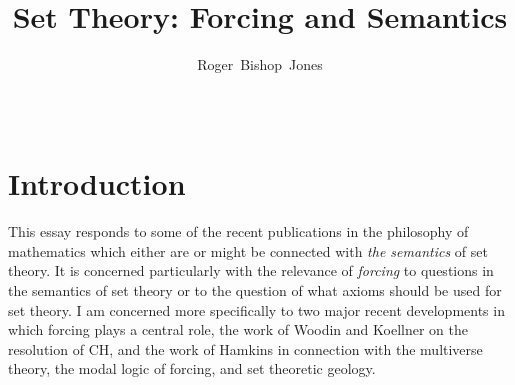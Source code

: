 \documentclass[10pt,titlepage]{article}
\title{Set Theory: Forcing and Semantics}
\author{Roger~Bishop~Jones}
\date{\ }
\newcommand{\ignore}[1]{}
\begin{document}
                               
\begin{titlepage}
\maketitle


\ignore{
\vfill

\begin{abstract}

\end{abstract}

\begin{centering}

{\footnotesize

\copyright\ Roger~Bishop~Jones;
}%

\end{centering}
}%

\end{titlepage}

\setcounter{tocdepth}{2}
{\parskip-0pt\tableofcontents}




\section{Introduction}

This essay responds to some of the recent publications in the philosophy of mathematics which either are or might be connected with \emph{the semantics} of set theory.
It is concerned particularly with the relevance of \emph{forcing} to questions in the semantics of set theory or to the question of what axioms should be used for set theory.
I am concerned more specifically to two major recent developments in which forcing plays a central role, the work of Woodin and Koellner on the resolution of CH, and the work of Hamkins in connection with the multiverse theory, the modal logic of forcing, and set theoretic geology.
\end{document}
